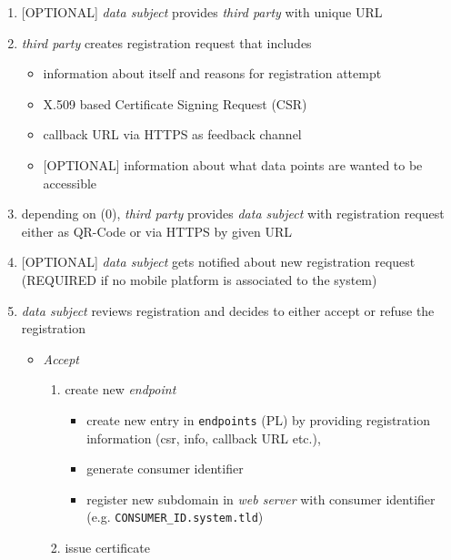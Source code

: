 \documentclass[12pt,english,a4paper,titlepage,cleardoublepage=empty,dottedtoc]{report}
\providecommand{\tightlist}{%
  \setlength{\itemsep}{0pt}\setlength{\parskip}{0pt}}
\begin{document}
\begin{enumerate}
\def\labelenumi{\arabic{enumi}.}
\setcounter{enumi}{-1}
\item
  {[}OPTIONAL{]} \emph{data subject} provides \emph{third party} with
  unique URL
\item
  \emph{third party} creates registration request that includes

  \begin{itemize}
  \tightlist
  \item
    information about itself and reasons for registration attempt
  \item
    X.509 based Certificate Signing Request (CSR)
  \item
    callback URL via HTTPS as feedback channel
  \item
    {[}OPTIONAL{]} information about what data points are wanted to be
    accessible
  \end{itemize}
\item
  depending on (0), \emph{third party} provides \emph{data subject} with
  registration request either as QR-Code or via HTTPS by given URL
\item
  {[}OPTIONAL{]} \emph{data subject} gets notified about new
  registration request (REQUIRED if no mobile platform is associated to
  the system)
\item
  \emph{data subject} reviews registration and decides to either accept
  or refuse the registration

  \begin{itemize}
  \tightlist
  \item
    \emph{Accept}

    \begin{enumerate}
    \def\labelenumii{\arabic{enumii})}
    \tightlist
    \item
      create new \emph{endpoint}

      \begin{itemize}
      \tightlist
      \item
        create new entry in \texttt{endpoints} (PL) by providing
        registration information (csr, info, callback URL etc.),
      \item
        generate consumer identifier
      \item
        register new subdomain in \emph{web server} with consumer
        identifier (e.g. \texttt{CONSUMER\_ID.system.tld})
      \end{itemize}
    \item
      issue certificate


\end{enumerate}
\end{itemize}
\end{enumerate}
\end{document}
